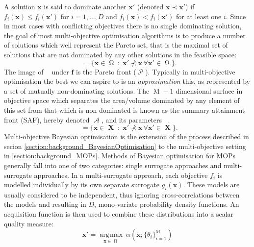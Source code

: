 \documentclass[conference]{IEEEtran}
\DeclareMathOperator*{\evaluatedx}{\bX}
\DeclareMathOperator*{\paretofront}{\mathcal{P}}
\DeclareMathOperator*{\paretoset}{\evaluatedx_{\mathcal{P}}}
\DeclareMathOperator*{\attainmentfront}{\mathcal{A}}
\DeclareMathOperator*{\attainmentset}{\evaluatedx_{\mathcal{A}}}
\DeclareMathOperator*{\parameterspace}{\Omega}
\DeclareMathOperator*{\nobj}{M}
\DeclareMathOperator*{\argmax}{\arg\!\max}
\newcommand{\bx}{\mathbf{x}}
\newcommand{\bX}{\mathbf{X}}
\newcommand{\bff}{\mathbf{f}}
\newcommand{\mnote}[2][\textcolor{red}{\dagger}]{$#1$\marginpar{\color{red}\raggedright\tiny$#1$
    #2}}
\begin{document}
A solution $\bx$ is said to dominate another $\bx'$ (denoted $\bx \prec \bx'$) if $f_i(\bx) \le f_i(\bx')$ for $i = 1, \ldots, D$ and $ f_i(\bx) < f_i(\bx')$ for at least one $i$. Since in most cases with conflicting objectives there is no single dominating solution, the goal of most multi-objective optimisation algorithms is to produce a number of solutions which well represent the Pareto set, that is the maximal set of solutions that are not dominated by any other solutions in the feasible space:
\begin{equation}\label{eqn: Pareto_set}
  \paretoset = \{\mathbf{x} \in \parameterspace \;:\;
  \bx' \not\prec \bx \,\forall \bx' \in \parameterspace \}.
\end{equation}
The image of $\paretoset$ under $\bff$ is the Pareto front ($\paretofront$). Typically in multi-objective optimisation the best we can aspire to is an \emph{approximation} this, as represented by a set of mutually non-dominating solutions. The $\nobj-1$ dimensional surface in objective space which separates the area/volume dominated by any element of this set from that which is non-dominated is known as the summary attainment front (SAF), hereby denoted $\attainmentfront$, and its parameters $\attainmentset$.
\begin{equation}\label{eqn: Attainment_set}
  \attainmentset = \{\mathbf{x} \in \evaluatedx \;:\;
  \bx' \not\prec \bx \,\forall \bx' \in \evaluatedx \}.
\end{equation}
Multi-objective Bayesian optimisation is the extension of the process described in secion \ref{section:background_BayesianOptimisation} to the multi-objective setting in \ref{section:background_MOPs}. Methods of Bayesian optimisation for MOPs generally fall into one of two categories: single surrogate approaches and multi-surrogate approaches. In a multi-surrogate approach, each objective $f_i$ is modelled individually by its own separate surrogate $g_i(\bx)$. These models are usually considered to be independent, thus ignoring
cross-correlations between the models and resulting in $D$, mono-variate probability density functions. An acquisition function is then used to combine these distributions into a scalar quality measure:
\begin{equation}\label{eqn: eqn: max_alpha_mop}
   \bx' = \underset{\mathbf{x}\in \parameterspace}{\argmax}\:\alpha(\mathbf{x}; \{\theta_i\}_{i=1}^{\nobj})
\end{equation}
\end{document}
